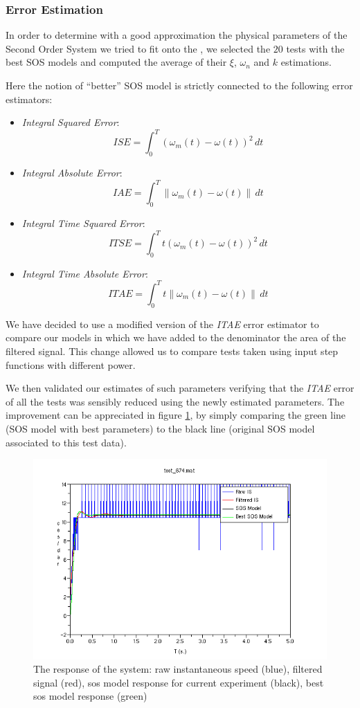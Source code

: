 \subsubsection{Error Estimation}

In order to determine with a good approximation the physical parameters of the Second Order System we tried to fit onto the \LEGOMOTOR{}, we selected the $20$ tests with the best SOS models and computed the average of their $\xi$, $\omega_n$ and $k$ estimations.

Here the notion of ``better'' SOS model is strictly connected to the following error estimators:
\begin{itemize}
\item \emph{Integral Squared Error}:
  \[
	ISE = \int_0^T(\omega_m(t)-\omega(t))^2\,dt
  \]
\item \emph{Integral Absolute Error}:
  \[
	IAE = \int_0^T\|\omega_m(t)-\omega(t)\|\,dt
  \]
\item \emph{Integral Time Squared Error}:
  \[
	ITSE = \int_0^Tt(\omega_m(t)-\omega(t))^2\,dt
  \]
\item \emph{Integral Time Absolute Error}:
  \[
	ITAE = \int_0^Tt\|\omega_m(t)-\omega(t)\|\,dt
  \]
\end{itemize}

We have decided to use a modified version of the \emph{ITAE} error estimator to compare our models in which we have added to the denominator the area of the filtered signal. This change allowed us to compare tests taken using input step functions with different power.

We then validated our estimates of such parameters verifying that the \emph{ITAE} error of all the tests was sensibly reduced using the newly estimated parameters. The improvement can be appreciated in figure \ref{fig:Result}, by simply comparing the green line (SOS model with best parameters) to the black line (original SOS model associated to this test data).

\begin{figure}[htbp]
\center
  \includegraphics[scale=0.70]{FIGURES_1/power70test24.png}
  \caption{The response of the system: raw instantaneous speed (blue), filtered signal (red), sos model response for current experiment (black), best sos model response (green)}
  \label{fig:Result}
\end{figure}


